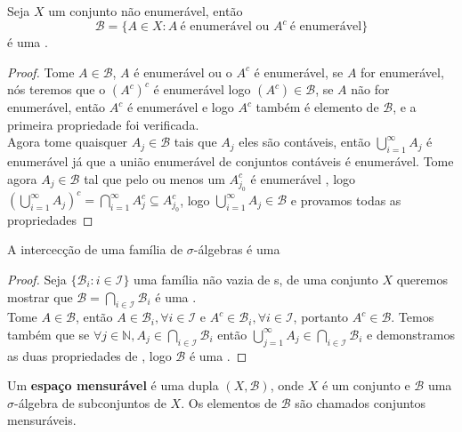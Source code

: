 \begin{exemplo} \label{ex1.2}
    Seja $X$ um conjunto não enumerável, então
    \[ 
    \mathcal{B} = \{ A \in X : A \ \text{é enumerável ou } A^c \ \text{é enumerável} \}
    \]
    é uma \sig. 
    
    \begin{proof}
        Tome $A \in \mathcal{B}$, $A$ é enumerável ou o $A^c$ é enumerável, se $A$ for enumerável, 
        nós teremos que o $(A^c)^c$ é enumerável logo $(A^c) \in \mathcal{B}$, se $A$ não for 
        enumerável, então $A^c$ é enumerável e logo $A^c$ também é elemento de $\mathcal{B}$, e a 
        primeira propriedade foi verificada.  \\
        Agora tome quaisquer $A_j \in \mathcal{B}$ tais que $A_j$ eles são contáveis, 
        então $ \bigcup _{i=1} ^{\infty}  A_j$ é enumerável já que a união enumerável de conjuntos 
        contáveis é enumerável. Tome agora $A_j \in \mathcal{B}$ tal que pelo ou menos um 
        $A_{j_0} ^c$ é enumerável , logo $(\bigcup_{i=1}^\infty A_j)^c 
        = \bigcap_{i=1}^\infty A_j ^c \subseteq A_{j_0}^c $, logo 
        $\bigcup_{i=1}^\infty A_j \in \mathcal{B}$ e provamos todas as propriedades 
    \end{proof}

\end{exemplo}

\begin{lema} \label{lema1.1}
    A intercecção de uma família de $\sigma$-álgebras é uma \sig 

    \begin{proof}
        Seja $ \{ \mathcal{B}_i : i \in \mathcal{I}  \} $ uma família não vazia de \sig s,
        de uma conjunto $X$ queremos mostrar 
        que $ \mathcal{B} = \bigcap_{i \in \mathcal{I}} \mathcal{B}_i $ é uma \sig. \\
        Tome $A \in \mathcal{B}$, então $ A \in \mathcal{B}_i , \forall i \in \mathcal{I}$ e
        $A^c \in \mathcal{B}_i, \forall i \in \mathcal{I}$, portanto $A^c \in \mathcal{B}$.
        Temos também que se $\forall j \in \mathbb{N}, A_ {j} \in \bigcap_{i \in \mathcal{I}} \mathcal{B}_i$ então 
        $\bigcup _{j = 1} ^{\infty} A_j \in \bigcap_{i \in \mathcal{I}} \mathcal{B}_i $ e demonstramos
        as duas propriedades de \sig, logo $\mathcal{B}$ é uma \sig . 
    \end{proof}

\end{lema}

\begin{definicao}
    
    Um \textbf{espaço mensurável} é uma dupla $(X,\mathcal{B})$, onde $X$ é um conjunto e $\mathcal{B}$
    uma $\sigma$-álgebra de subconjuntos de $X$. Os elementos de $\mathcal{B}$ são chamados 
    conjuntos mensuráveis. 

\end{definicao}

